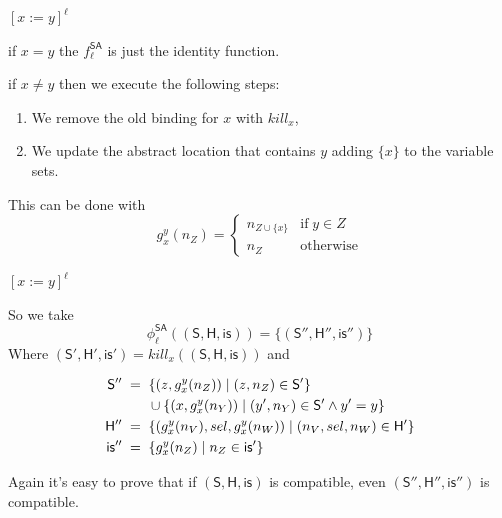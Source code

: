\documentclass[xcolor=svgnames,11pt]{beamer}
\begin{document}
\begin{frame}{$[x:=y]^\ell$}

if $x = y$ the $f_\ell^{\textsf{SA}}$ is just the identity function.

\medskip
\pause

if $x \neq y$ then we execute the following steps:
\begin{enumerate}
\item We remove the old binding for $x$ with $kill_x$,
\item We update the abstract location that contains $y$ adding $\{ x \}$ to the variable sets.
\end{enumerate}

\medskip
\pause

This can be done with
$$g_x^y (n_Z) = \left \{
\begin{array}{ll}
n_{Z \cup \{ x \} } & \mathrm{if}\; y \in Z \\
n_Z & \mathrm{otherwise}
\end{array}
\right.
$$

\end{frame}

\begin{frame}{$[x:=y]^\ell$}

So we take 
$${\phi}_\ell^{\mathsf{SA}}\mathsf{((S,H,is))} = \{ \mathsf{ (S'',H'',is'') } \} $$
Where $\mathsf{(S', H', is')} = kill_x (\mathsf{(S,H,is)})$ and

\pause

\begin{align*}
\mathsf{S''} \; &= \; \{ (z, g_x^y(n_Z)) \;|\; (z, n_Z) \in \mathsf{S'} \} \\
&\;\;\quad \cup \{ (x, g_x^y(n_Y)) \;|\; (y', n_Y) \in \mathsf{S'} \wedge y' = y\} \\
\mathsf{H''} \; &= \; \{ (g_x^y(n_V), sel, g_x^y(n_W)) \;|\; (n_V, sel, n_W) \in \mathsf{H'} \} \\
\medskip
\mathsf{is''} \; &= \; \{ g_x^y(n_Z) \;|\; n_Z \in \mathsf{is'} \}
\end{align*}

\medskip
\pause

Again it's easy to prove that if $\mathsf{(S,H,is)}$ is compatible, even $\mathsf{(S'',H'',is'')}$ is compatible.

\end{frame}
\end{document}
